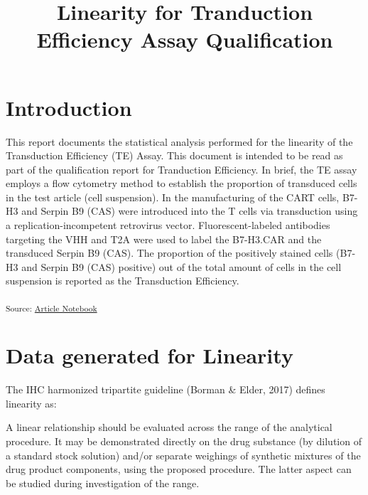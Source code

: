 \documentclass[
]{agujournal2019}
\begin{document}
\title{Linearity for Tranduction Efficiency Assay Qualification}







\section{Introduction}\label{introduction}

This report documents the statistical analysis performed for the
linearity of the Transduction Efficiency (TE) Assay. This document is
intended to be read as part of the qualification report for Tranduction
Efficiency. In brief, the TE assay employs a flow cytometry method to
establish the proportion of transduced cells in the test article (cell
suspension). In the manufacturing of the CART cells, B7-H3 and Serpin B9
(CAS) were introduced into the T cells via transduction using a
replication-incompetent retrovirus vector. Fluorescent-labeled
antibodies targeting the VHH and T2A were used to label the B7-H3.CAR
and the transduced Serpin B9 (CAS). The proportion of the positively
stained cells (B7-H3 and Serpin B9 (CAS) positive) out of the total
amount of cells in the cell suspension is reported as the Transduction
Efficiency.

\textsubscript{Source:
\href{https://jinkaiteo.github.io/quarto-template/index.qmd.html}{Article
Notebook}}

\section{Data generated for
Linearity}\label{data-generated-for-linearity}

The IHC harmonized tripartite guideline (Borman \& Elder, 2017) defines
linearity as:

\begin{tcolorbox}[enhanced jigsaw, bottomtitle=1mm, rightrule=.15mm, left=2mm, leftrule=.75mm, toptitle=1mm, titlerule=0mm, colback=white, opacitybacktitle=0.6, arc=.35mm, opacityback=0, bottomrule=.15mm, breakable, colbacktitle=quarto-callout-note-color!10!white, title=\textcolor{quarto-callout-note-color}{\faInfo}\hspace{0.5em}{IHC Guidlines}, coltitle=black, colframe=quarto-callout-note-color-frame, toprule=.15mm]

A linear relationship should be evaluated across the range of the
analytical procedure. It may be demonstrated directly on the drug
substance (by dilution of a standard stock solution) and/or separate
weighings of synthetic mixtures of the drug product components, using
the proposed procedure. The latter aspect can be studied during
investigation of the range.

\end{tcolorbox}
\end{document}
